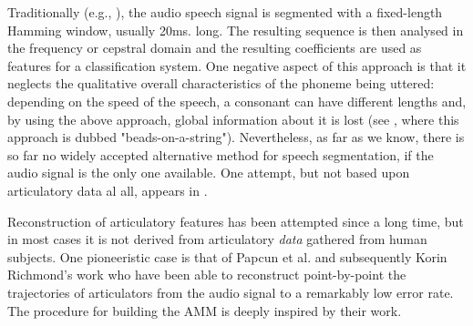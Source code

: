 Traditionally (e.g., \cite{bourl,salvi}), the audio speech signal is segmented with a
fixed-length Hamming window, usually 20ms. long. The resulting sequence
is then analysed in the frequency or cepstral domain and the
resulting coefficients are used as features for a classification system.
One negative aspect of this approach is that it
neglects the qualitative overall characteristics of the
phoneme being uttered: depending on the speed of the speech, a consonant
can have different lengths and, by using the above approach, global
information about it is lost (see \cite{ostendorf}, where this approach is
dubbed "beads-on-a-string"). Nevertheless, as far as we know, there is
so far no widely accepted alternative method for speech segmentation,
if the audio signal is the only one available. One attempt, but not based
upon articulatory data al all, appears in \cite{bourlard}.

Reconstruction of articulatory features has been attempted since a long
time, but in most cases it is not derived from articulatory \emph{data}
gathered from human subjects. One pioneeristic case is that of Papcun
et al. \cite{papcun} and subsequently Korin Richmond's work
\cite{richmond2002,richmond2007} who have been able to reconstruct point-by-point
the trajectories of articulators from the audio signal to a remarkably low
error rate. The procedure for building the AMM is deeply inspired by their
work.
